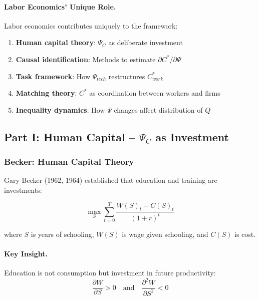 \paragraph{Labor Economics' Unique Role.}
Labor economics contributes uniquely to the framework:
\begin{enumerate}
    \item \textbf{Human capital theory}: $\Psi_C$ as deliberate investment
    \item \textbf{Causal identification}: Methods to estimate $\partial C^* / \partial \Psi$
    \item \textbf{Task framework}: How $\Psi_{tech}$ restructures $C^*_{work}$
    \item \textbf{Matching theory}: $C^*$ as coordination between workers and firms
    \item \textbf{Inequality dynamics}: How $\Psi$ changes affect distribution of $Q$
\end{enumerate}

\subsection{Part I: Human Capital – $\Psi_C$ as Investment}

\subsubsection{Becker: Human Capital Theory}

Gary Becker (1962, 1964) established that education and training are investments:

\begin{equation}
\boxed{
\max_{S} \sum_{t=0}^{T} \frac{W(S)_t - C(S)_t}{(1+r)^t}
}
\label{eq:becker-hc}
\end{equation}

where $S$ is years of schooling, $W(S)$ is wage given schooling, and $C(S)$ is cost.

\paragraph{Key Insight.}
Education is not consumption but investment in future productivity:
\begin{equation}
\frac{\partial W}{\partial S} > 0 \quad \text{and} \quad \frac{\partial^2 W}{\partial S^2} < 0
\end{equation}

